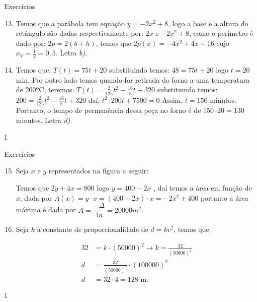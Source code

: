 \begin{answer}{Exercícios}
{\exerciselist
\begin{enumerate}\setcounter{enumi}{12}
\item Temos que a parábola tem equação \(y=-2x^2+8\), logo a base e a altura do retângulo são dadas respectivamente por: \(2x\) e \(-2x^2+8\), como o perímetro é dado por: \(2p=2(b+h)\), temos que \(2p(x)=-4x^2+4x+16\) cujo \(x_V=\frac{1}{2}=0,5\). Letra \textit{b)}.

\item Temos que: \(T(t) = 75t+20\) substituindo temos: \(48 = 75t+20\) logo \(t = 20\) min. Por outro lado temos quando for  retirada do forno  a uma temperatura  de 200ºC,  teremos:
\(T(t) = \frac{2}{125}t^2− \frac{16}{5}t+320\) substituindo temos: \(200 = \frac{2}{125}t^2− \frac{16}{5}t+320\) daí, \(t^2 – 200t + 7 500 = 0\)
Assim, \(t = 150\) minutos. Portanto, o tempo de permanência dessa peça no forno é de \(150 – 20 = 130\) minutos. Letra \textit{d)}.
\end{enumerate}
}{1}
\end{answer}
\clearmargin
\begin{answer}{Exercícios}
{\exerciselist
\begin{enumerate}\setcounter{enumi}{14}
\item Seja \(x\) e \(y\) representados na figura a seguir:

\begin{figure}[H]
\centering

\end{figure}

Temos que \(2y+4x=800\) logo \(y=400-2x\) , daí temos a área em função de \(x\), dada por \(A(x)=y\cdot x=(400-2x)\cdot x=-2x^2+400\) portanto a área máxima é dada por \(A=\dfrac{-\Delta}{4a}=20000m^2\).


\item Seja \(k\) a constante de proporcionalidade de \(d=kv^2\), temos que:

\begin{align*}
32&=k \cdot (50 000)^2 \to k=\frac{32}{(50 000)^2}\\
d&=\frac{32}{(50 000)^2} \cdot (100 000)^2\\
d&=32 \cdot 4 = 128\text{ m}.
\end{align*}
\end{enumerate}
}{1}
\end{answer}
